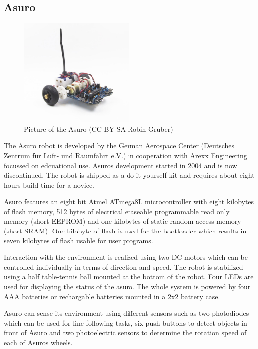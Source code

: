 \documentclass[twocolumn]{article}
\begin{document}
\subsection{Asuro}
\begin{figure}[h!]
  \centering
  \includegraphics[width=0.5\textwidth]{images/asuro.jpg}
  \caption{Picture of the Asuro (CC-BY-SA Robin Gruber)}
\end{figure}

The Asuro robot is developed by the German Aerospace Center (Deutsches Zentrum für Luft- und Raumfahrt e.V.) in cooperation with Arexx Engineering focussed on edcuational use. Asuros development started in 2004 and is now discontinued. The robot is shipped as a do-it-yourself kit and requires about eight hours build time for a novice. 

Asuro features an eight bit Atmel ATmega8L microcontroller with eight kilobytes of flash memory, 512 bytes of electrical eraseable programmable read only memory (short EEPROM) and one kilobytes of static random-access memory (short SRAM). One kilobyte of flash is used for the bootloader which results in seven kilobytes of flash usable for user programs.

Interaction with the environment is realized using two DC motors which can be controlled individually in terms of direction and speed. The robot is stabilized using a half table-tennis ball mounted at the bottom of the robot. Four LEDs are used for displaying the status of the asuro. The whole system is powered by four AAA batteries or rechargable batteries mounted in a 2x2 battery case. 

Asuro can sense its environment using different sensors such as two photodiodes which can be used for line-following tasks, six push buttons to detect objects in front of Asuro and two photoelectric sensors to determine the rotation speed of each of Asuros wheels.
\end{document}
